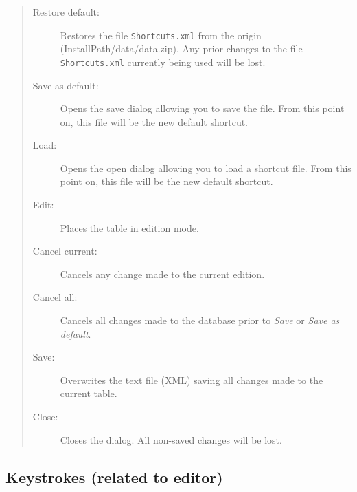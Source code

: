 \begin{quote}
  \begin{footnotesize}
    \begin{description}
      \item[Restore default:]
        Restores the file \texttt{Shortcuts.xml} from the origin
        (InstallPath/data/data.zip). Any prior changes to the file
        \texttt{Shortcuts.xml} currently being used will be lost.
      \item[Save as default:]
        Opens the save dialog allowing you to save the file. From
        this point on, this file will be the new default shortcut.
      \item[Load:]
        Opens the open dialog allowing you to load a shortcut file.
        From this point on, this file will be the new default shortcut.
      \item[Edit:]
        Places the table in edition mode.
      \item[Cancel current:]
        Cancels any change made to the current edition.
      \item[Cancel all:]
        Cancels all changes made to the database prior to \textit{Save} or \textit{Save as default}.
      \item[Save:]
        Overwrites the text file (XML) saving all changes made to the current table.
      \item[Close:]
        Closes the dialog. All non-saved changes will be lost.
    \end{description}
  \end{footnotesize}
\end{quote}

\subsection{Keystrokes (related to editor)}

